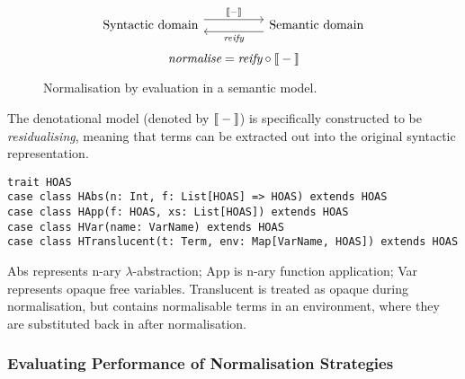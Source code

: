 \documentclass[../../main.tex]{subfiles}
\begin{document}
\begin{figure}
\begin{equation*}
\begin{tikzcd}
  \text{Syntactic domain} \arrow[rr, "\text{\textlbrackdbl} - \text{\textrbrackdbl}", shift left=2] &  & \text{Semantic domain} \arrow[ll, "\textit{reify}", shift left=2]
\end{tikzcd}
\end{equation*}
\vspace{0.5ex}
\begin{equation*}
\textit{normalise} = \textit{reify} \circ \text{\textlbrackdbl} - \text{\textrbrackdbl}
\end{equation*}
\caption{Normalisation by evaluation in a semantic model.}
\label{fig:nbe}
\end{figure}

The denotational model (denoted by $\text{\textlbrackdbl} - \text{\textrbrackdbl}$) is specifically constructed to be \emph{residualising}, meaning that terms can be extracted out into the original syntactic representation.


\begin{verbatim}
trait HOAS
case class HAbs(n: Int, f: List[HOAS] => HOAS) extends HOAS
case class HApp(f: HOAS, xs: List[HOAS]) extends HOAS
case class HVar(name: VarName) extends HOAS
case class HTranslucent(t: Term, env: Map[VarName, HOAS]) extends HOAS
\end{verbatim}
%
Abs represents n-ary $\lambda$-abstraction; App is n-ary function application; Var represents opaque free variables.
Translucent is treated as opaque during normalisation, but contains normalisable terms in an environment, where they are substituted back in after normalisation.


\subsubsection{Evaluating Performance of Normalisation Strategies}
\end{document}

